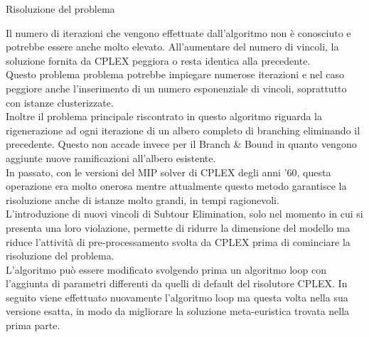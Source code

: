 \begin{algorithm}
\caption{Risoluzione del problema}
\begin{algorithmic}
\STATE {}
\STATE {}
\STATE {}
\ENDIF
\STATE {}
\ENDWHILE
\end{algorithmic}
\end{algorithm}
Il numero di iterazioni che vengono effettuate dall'algoritmo non è conosciuto e potrebbe essere anche molto elevato. All'aumentare del numero di vincoli, la soluzione fornita da CPLEX peggiora o resta identica alla precedente.\\
Questo problema problema potrebbe impiegare numerose iterazioni e nel caso peggiore anche l'inserimento di un numero esponenziale di vincoli, soprattutto con istanze clusterizzate.\\
Inoltre il problema principale riscontrato in questo algoritmo riguarda la rigenerazione ad ogni iterazione di un albero completo di branching eliminando il precedente. Questo non accade invece per il Branch \& Bound in quanto vengono aggiunte nuove ramificazioni all'albero esistente.\\
In passato, con le versioni del MIP solver di CPLEX degli anni '60, questa operazione era molto onerosa mentre attualmente questo metodo garantisce la risoluzione anche di istanze molto grandi, in tempi ragionevoli.\\
L'introduzione di nuovi vincoli di Subtour Elimination, solo nel momento in cui si presenta una loro violazione, permette di ridurre la dimensione del modello ma riduce l'attività di pre-processamento svolta da CPLEX prima di cominciare la risoluzione del problema.\\
L'algoritmo può essere modificato svolgendo prima un algoritmo loop con l'aggiunta di parametri differenti da quelli di default del risolutore CPLEX. In seguito viene effettuato nuovamente l'algoritmo loop ma questa volta nella sua versione esatta, in modo da migliorare la soluzione meta-euristica trovata nella prima parte. 